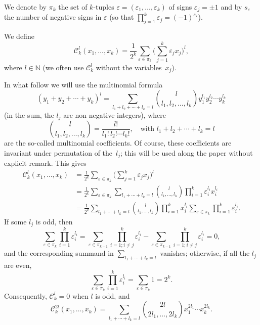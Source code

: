 \documentclass[12pt,leqno]{amsart}
\numberwithin{equation}{section}
\theoremstyle{plain}
\newcommand{\cC}{\mathcal{C}}
\newcommand{\NN}{\mathbb{N}}
\newcommand{\eps}{\varepsilon}
\begin{document}
We denote by $\pi_k$ the set of $k$-tuples $\eps = (\eps_1,\dots,\eps_k)$ of signs $\eps_j=\pm 1$ and by $s_\eps$ the number of negative signs in $\eps$ (so that $\prod_{j=1}^k\eps_j = (-1)^{s_\eps}$).

We define
\begin{equation*}
  \cC_{k}^{l}(x_1,\dots,x_k) = \frac{1}{2^k} \sum_{\eps\in\pi_k}
   \Big( \sum_{j=1}^k \eps_j x_j\Big)^l,
\end{equation*}
where $l \in \NN$ (we often use $\cC_k^l$ without the variables~$x_j$).

In what follow we will use the multinomial formula
\[
(y_1 + y_2 + \cdots + y_k)^l
= \sum_{l_1+l_2+\cdots+l_k=l} \binom{l}{l_1,l_2,\dots,l_k} y_1^{l_1} y_2^{l_2} \cdots y_k^{l_k}
\]
(in the sum, the $l_j$ are non negative integers),
where
\begin{equation*}
  \binom{l}{l_1,l_2,\dots,l_k}
  = \frac{l!}{l_1!\,l_2!\cdots l_k!},
  \quad \text{with } l_1+l_2+\cdots+l_k=l
\end{equation*}
are the so-called multinomial coefficients.
Of course, these coefficients are invariant under permutation of the~$l_j$; this will be used along the paper without explicit remark.
This gives
\begin{align*}
  \cC_{k}^{l}(x_1,\dots,x_k) &= \frac{1}{2^k} \sum_{\eps\in\pi_k}
   \Big( \sum_{j=1}^k \eps_j x_j\Big)^l\\
   &= \frac{1}{2^k} \sum_{\eps\in\pi_k} \sum_{l_1+\cdots+l_k=l} \binom{l}{l_1,\dots,l_k}
  \prod_{i=1}^k \eps_i^{l_i}x_i^{l_i}\\
   &= \frac{1}{2^k} \sum_{l_1+\cdots+l_k=l} \binom{l}{l_1,\dots,l_k}
  \prod_{i=1}^k x_i^{l_i} \sum_{\eps\in\pi_k}\prod_{i=1}^k \eps_i^{l_i} .
\end{align*}
If some $l_j$ is odd, then
\[
\sum_{\eps\in\pi_k}\prod_{i=1}^k \eps_i^{l_i}
= \sum_{\eps\in\pi_{k-1}}\prod_{i=1;i\not=j}^k \eps_i^{l_i}
- \sum_{\eps\in\pi_{k-1}}\prod_{i=1;i\not=j}^k \eps_i^{l_i}=0,
\]
and the corresponding summand in $ \sum_{l_1+\cdots+l_k=l}$ vanishes;
otherwise, if all the $l_j$ are even,
\[
\sum_{\eps\in\pi_k} \prod_{i=1}^k \eps_i^{l_i} = \sum_{\eps\in\pi_k} 1=2^k.
\]
Consequently, $\cC_{k}^{l}=0$ when $l$ is odd, and
\begin{equation}
\label{cag}
  \cC_{k}^{2l}(x_1,\dots,x_k)
  = \sum_{l_1+\cdots+l_k=l}
  \binom{2l}{2l_1,\dots,2l_k} x_1^{2l_1} \cdots x_k^{2l_k}.
\end{equation}
\end{document}
